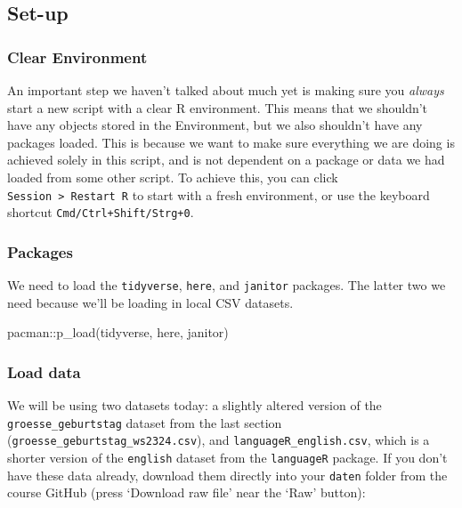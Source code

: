 \documentclass[
  letterpaper,
  DIV=11,
  numbers=noendperiod]{scrartcl}
\newenvironment{Shaded}{\begin{snugshade}}{\end{snugshade}}
\newcommand{\FunctionTok}[1]{\textcolor[rgb]{0.28,0.35,0.67}{#1}}
\newcommand{\NormalTok}[1]{\textcolor[rgb]{0.00,0.23,0.31}{#1}}
\newcommand{\SpecialCharTok}[1]{\textcolor[rgb]{0.37,0.37,0.37}{#1}}
\begin{document}
\hypertarget{set-up}{%
\subsection{Set-up}\label{set-up}}

\hypertarget{clear-environment}{%
\subsubsection{Clear Environment}\label{clear-environment}}

An important step we haven't talked about much yet is making sure you
\emph{always} start a new script with a clear R environment. This means
that we shouldn't have any objects stored in the Environment, but we
also shouldn't have any packages loaded. This is because we want to make
sure everything we are doing is achieved solely in this script, and is
not dependent on a package or data we had loaded from some other script.
To achieve this, you can click
\texttt{Session\ \textgreater{}\ Restart\ R} to start with a fresh
environment, or use the keyboard shortcut
\texttt{Cmd/Ctrl+Shift/Strg+0}.

\hypertarget{packages}{%
\subsubsection{Packages}\label{packages}}

We need to load the \texttt{tidyverse}, \texttt{here}, and
\texttt{janitor} packages. The latter two we need because we'll be
loading in local CSV datasets.

\begin{Shaded}
\begin{Highlighting}[]
\NormalTok{pacman}\SpecialCharTok{::}\FunctionTok{p\_load}\NormalTok{(tidyverse,}
\NormalTok{               here,}
\NormalTok{               janitor)}
\end{Highlighting}
\end{Shaded}

\hypertarget{load-data}{%
\subsubsection{Load data}\label{load-data}}

We will be using two datasets today: a slightly altered version of the
\texttt{groesse\_geburtstag} dataset from the last section
(\texttt{groesse\_geburtstag\_ws2324.csv}), and
\texttt{languageR\_english.csv}, which is a shorter version of the
\texttt{english} dataset from the \texttt{languageR} package. If you
don't have these data already, download them directly into your
\texttt{daten} folder from the course GitHub (press `Download raw file'
near the `Raw' button):
\end{document}

